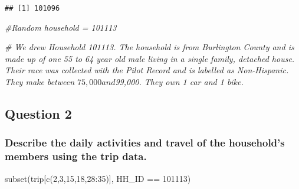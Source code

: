 \documentclass[
]{article}
\newenvironment{Shaded}{\begin{snugshade}}{\end{snugshade}}
\newcommand{\CommentTok}[1]{\textcolor[rgb]{0.56,0.35,0.01}{\textit{#1}}}
\newcommand{\DecValTok}[1]{\textcolor[rgb]{0.00,0.00,0.81}{#1}}
\newcommand{\FunctionTok}[1]{\textcolor[rgb]{0.00,0.00,0.00}{#1}}
\newcommand{\NormalTok}[1]{#1}
\newcommand{\SpecialCharTok}[1]{\textcolor[rgb]{0.00,0.00,0.00}{#1}}
\begin{document}
\begin{Shaded}
\end{Shaded}

\begin{verbatim}
## [1] 101096
\end{verbatim}

\begin{Shaded}
\begin{Highlighting}[]
\CommentTok{\#Random household = 101113}

\CommentTok{\# We drew Household 101113. The household is from Burlington County and is made up of one 55 to 64 year old male living in a single family, detached house. Their race was collected with the Pilot Record and is labelled as Non{-}Hispanic. They make between $75,000 and $99,000.  They own 1 car and 1 bike. }
\end{Highlighting}
\end{Shaded}

\hypertarget{question-2}{%
\subsection{Question 2}\label{question-2}}

\hypertarget{describe-the-daily-activities-and-travel-of-the-households-members-using-the-trip-data.}{%
\subsubsection{Describe the daily activities and travel of the
household's members using the trip
data.}\label{describe-the-daily-activities-and-travel-of-the-households-members-using-the-trip-data.}}

\begin{Shaded}
\begin{Highlighting}[]
\FunctionTok{subset}\NormalTok{(trip[}\FunctionTok{c}\NormalTok{(}\DecValTok{2}\NormalTok{,}\DecValTok{3}\NormalTok{,}\DecValTok{15}\NormalTok{,}\DecValTok{18}\NormalTok{,}\DecValTok{28}\SpecialCharTok{:}\DecValTok{35}\NormalTok{)], HH\_ID }\SpecialCharTok{==} \DecValTok{101113}\NormalTok{)}
\end{Highlighting}
\end{Shaded}
\end{document}
